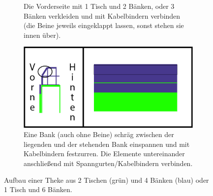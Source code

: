 \begin{figure}[h]
\begin{subfigure}[t]{0.45\textwidth}
    \caption{Die Vorderseite mit 1 Tisch und 2 Bänken, oder 3 Bänken verkleiden und mit Kabelbindern verbinden (die Beine jeweils eingeklappt lassen, sonst stehen sie innen über).}
  \end{subfigure}
  \hfill
  \begin{subfigure}[t]{0.45\textwidth}
    \includegraphics[width=\textwidth]{2d_4.png}
    \caption{Eine Bank (auch ohne Beine) schräg zwischen der liegenden und der stehenden Bank einspannen und mit Kabelbindern festzurren. Die Elemente untereinander anschließend mit Spanngurten/Kabelbindern verbinden.}
  \end{subfigure}
  \caption{Aufbau einer Theke aus 2 Tischen (grün) und 4 Bänken (blau) oder 1 Tisch und 6 Bänken.}
  \label{theke2d}
\end{figure}

